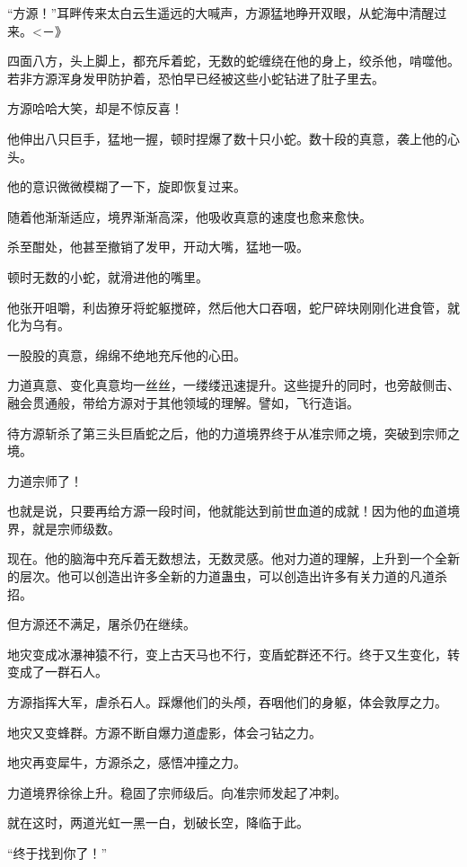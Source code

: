 
\begin{this_body}

“方源！”耳畔传来太白云生遥远的大喊声，方源猛地睁开双眼，从蛇海中清醒过来。<－》

四面八方，头上脚上，都充斥着蛇，无数的蛇缠绕在他的身上，绞杀他，啃噬他。若非方源浑身发甲防护着，恐怕早已经被这些小蛇钻进了肚子里去。

方源哈哈大笑，却是不惊反喜！

他伸出八只巨手，猛地一握，顿时捏爆了数十只小蛇。数十段的真意，袭上他的心头。

他的意识微微模糊了一下，旋即恢复过来。

随着他渐渐适应，境界渐渐高深，他吸收真意的速度也愈来愈快。

杀至酣处，他甚至撤销了发甲，开动大嘴，猛地一吸。

顿时无数的小蛇，就滑进他的嘴里。

他张开咀嚼，利齿獠牙将蛇躯搅碎，然后他大口吞咽，蛇尸碎块刚刚化进食管，就化为乌有。

一股股的真意，绵绵不绝地充斥他的心田。

力道真意、变化真意均一丝丝，一缕缕迅速提升。这些提升的同时，也旁敲侧击、融会贯通般，带给方源对于其他领域的理解。譬如，飞行造诣。

待方源斩杀了第三头巨盾蛇之后，他的力道境界终于从准宗师之境，突破到宗师之境。

力道宗师了！

也就是说，只要再给方源一段时间，他就能达到前世血道的成就！因为他的血道境界，就是宗师级数。

现在。他的脑海中充斥着无数想法，无数灵感。他对力道的理解，上升到一个全新的层次。他可以创造出许多全新的力道蛊虫，可以创造出许多有关力道的凡道杀招。

但方源还不满足，屠杀仍在继续。

地灾变成冰瀑神猿不行，变上古天马也不行，变盾蛇群还不行。终于又生变化，转变成了一群石人。

方源指挥大军，虐杀石人。踩爆他们的头颅，吞咽他们的身躯，体会敦厚之力。

地灾又变蜂群。方源不断自爆力道虚影，体会刁钻之力。

地灾再变犀牛，方源杀之，感悟冲撞之力。

力道境界徐徐上升。稳固了宗师级后。向准宗师发起了冲刺。

就在这时，两道光虹一黑一白，划破长空，降临于此。

“终于找到你了！”


\end{this_body}
